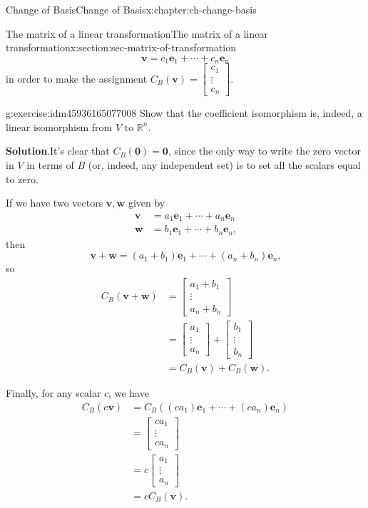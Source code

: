\documentclass[oneside,10pt,]{book}
\newcommand{\blocktitlefont}{\relax}
\numberwithin{equation}{section}
\newcommand{\bbm}{\begin{bmatrix}}
\newcommand{\ebm}{\end{bmatrix}}
\newcommand{\R}{\mathbb{R}}
\newcommand{\vv}{\mathbf{v}}
\newcommand{\ww}{\mathbf{w}}
\newcommand{\amp}{&}
\begin{document}
\begin{chapterptx}{Change of Basis}{}{Change of Basis}{}{}{x:chapter:ch-change-basis}
\begin{sectionptx}{The matrix of a linear transformation}{}{The matrix of a linear transformation}{}{}{x:section:sec-matrix-of-transformation}
\begin{equation*}
\vv = c_1\mathbf{e}_1+\cdots +c_n\mathbf{e}_n
\end{equation*}
in order to make the assignment \(C_B(\vv) = \bbm c_1\\\vdots \\c_n\ebm\).%
\begin{inlineexercise}{}{g:exercise:idm45936165077008}%
Show that the coefficient isomorphism is, indeed, a linear isomorphism from \(V\) to \(\R^n\).%
\par\smallskip%
\noindent\textbf{\blocktitlefont Solution}.\label{g:solution:idm45936165075456}{}\hypertarget{g:solution:idm45936165075456}{}\quad{}It's clear that \(C_B(\mathbf{0})=\mathbf{0}\), since the only way to write the zero vector in \(V\) in terms of \(B\) (or, indeed, any independent set) is to set all the scalars equal to zero.%
\par
If we have two vectors \(\vv,\ww\) given by%
\begin{align*}
\vv \amp = a_1\mathbf{e}_1+\cdots + a_n\mathbf{e}_n \\
\ww \amp = b_1\mathbf{e}_1+\cdots + b_n\mathbf{e}_n\text{,}
\end{align*}
then%
\begin{equation*}
\vv+\ww = (a_1+b_1)\mathbf{e}_1+\cdots + (a_n+b_n)\mathbf{e}_n\text{,}
\end{equation*}
so%
\begin{align*}
C_B(\vv+\ww) \amp = \bbm a_1+b_1\\\vdots \\ a_n+b_n\ebm \\
\amp = \bbm a_1\\\vdots\\a_n\ebm +\bbm b_1\\\vdots \\b_n\ebm\\
\amp = C_B(\vv)+C_B(\ww)\text{.}
\end{align*}
%
\par
Finally, for any scalar \(c\), we have%
\begin{align*}
C_B(c\vv) \amp = C_B((ca_1)\mathbf{e}_1+\cdots +(ca_n)\mathbf{e}_n)\\
\amp = \bbm ca_1\\\vdots \\ca_n\ebm\\
\amp =c\bbm a_1\\\vdots \\a_n\ebm\\
\amp =cC_B(\vv)\text{.}

\end{align*}
\end{inlineexercise}
\end{sectionptx}
\end{chapterptx}
\end{document}
